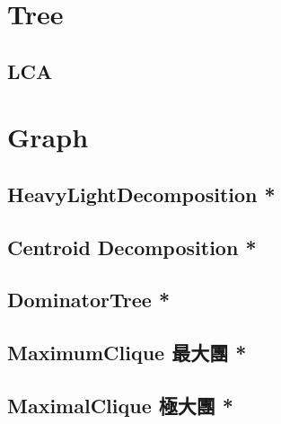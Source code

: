 \documentclass[a4paper,10pt,twocolumn,oneside]{article}
\begin{document}
\section{Tree}

\subsection{LCA}


\section{Graph}

\subsection{HeavyLightDecomposition *}


\subsection{Centroid Decomposition *}


\subsection{DominatorTree *}


\subsection{MaximumClique 最大團 *}

% 

\subsection{MaximalClique 極大團 *}

% 

%

% 
\end{document}
